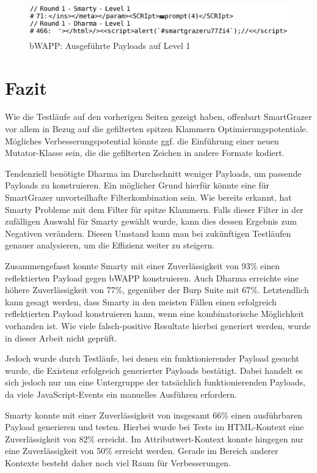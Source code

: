 \begin{figure}[htbp] 
	\centering
	\includegraphics[width=.9\textwidth]{contents/images/bWAPPExecutedResultsLevel1}
	\caption{bWAPP: Ausgeführte Payloads auf Level 1}
	\label{fig:bWAPPExecutedResultsLevel1}
\end{figure}


\FloatBarrier
\section{Fazit}\label{eval:Conclusion}



Wie die Testläufe auf den vorherigen Seiten gezeigt haben, offenbart SmartGrazer vor allem in Bezug auf die gefilterten spitzen Klammern Optimierungspotentiale. Mögliches Verbesserungspotential könnte ggf. die Einführung einer neuen Mutator-Klasse sein, die die gefilterten Zeichen in andere Formate kodiert.

Tendenziell benötigte Dharma im Durchschnitt weniger Payloads, um passende Payloads zu konstruieren. Ein möglicher Grund hierfür könnte eine für SmartGrazer unvorteilhafte Filterkombination sein. Wie bereits erkannt, hat Smarty Probleme mit dem Filter für spitze Klammern. Falls dieser Filter in der zufälligen Auswahl für Smarty gewählt wurde, kann dies dessen Ergebnis zum Negativen verändern. Diesen Umstand kann man bei zukünftigen Testläufen genauer analysieren, um die Effizienz weiter zu steigern.

Zusammengefasst konnte Smarty mit einer Zuverlässigkeit von 93\% einen reflektierten Payload gegen bWAPP konstruieren. Auch Dharma erreichte eine höhere Zuverlässigkeit von 77\%, gegenüber der Burp Suite mit 67\%. Letztendlich kann gesagt werden, dass Smarty in den meisten Fällen einen erfolgreich reflektierten Payload konstruieren kann, wenn eine kombinatorische Möglichkeit vorhanden ist. Wie viele falsch-positive Resultate hierbei generiert werden, wurde in dieser Arbeit nicht geprüft.

Jedoch wurde durch Testläufe, bei denen ein funktionierender Payload gesucht wurde, die Existenz erfolgreich generierter Payloads bestätigt. Dabei handelt es sich jedoch nur um eine Untergruppe der tatsächlich funktionierenden Payloads, da viele JavaScript-Events ein manuelles Ausführen erfordern.

Smarty konnte mit einer Zuverlässigkeit von insgesamt 66\% einen ausführbaren Payload generieren und testen. Hierbei wurde bei Tests im HTML-Kontext eine Zuverlässigkeit von 82\% erreicht. Im Attributwert-Kontext konnte hingegen nur eine Zuverlässigkeit von 50\% erreicht werden. Gerade im Bereich anderer Kontexte besteht daher noch viel Raum für Verbesserungen.
